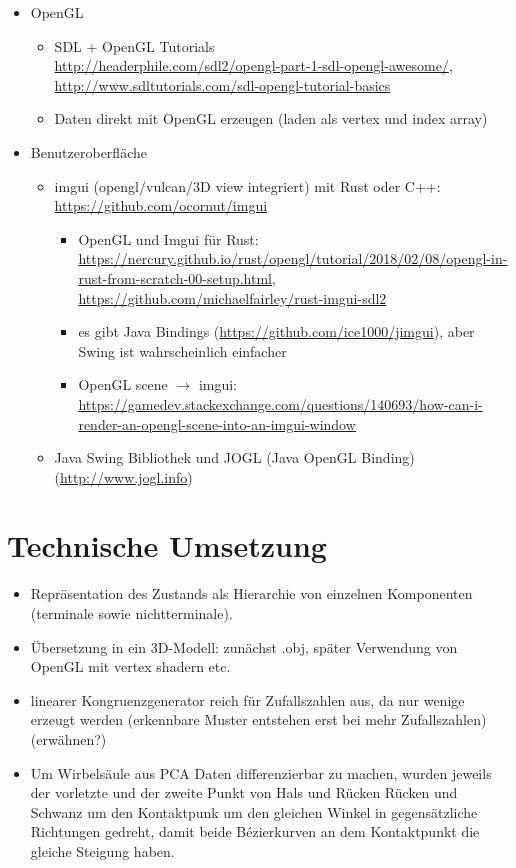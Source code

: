 \begin{itemize}
 \item OpenGL
 \begin {itemize}
  \item SDL + OpenGL Tutorials \\ \url{http://headerphile.com/sdl2/opengl-part-1-sdl-opengl-awesome/}, \\ \url{http://www.sdltutorials.com/sdl-opengl-tutorial-basics}
  \item Daten direkt mit OpenGL erzeugen (laden als vertex und index array)
 \end {itemize}

 \item Benutzeroberfläche
 \begin{itemize}
  \item imgui (opengl/vulcan/3D view integriert) mit Rust oder C++: \url{https://github.com/ocornut/imgui}
  
  \begin{itemize}
   \item OpenGL und Imgui für Rust: \url{https://nercury.github.io/rust/opengl/tutorial/2018/02/08/opengl-in-rust-from-scratch-00-setup.html}, \url{https://github.com/michaelfairley/rust-imgui-sdl2}
   \item es gibt Java Bindings (\url{https://github.com/ice1000/jimgui}), aber Swing ist wahrscheinlich einfacher
   \item OpenGL scene $\rightarrow$ imgui: \url{https://gamedev.stackexchange.com/questions/140693/how-can-i-render-an-opengl-scene-into-an-imgui-window}
  \end{itemize}

  
  \item Java Swing Bibliothek und JOGL (Java OpenGL Binding) (\url{http://www.jogl.info})
 \end{itemize}
\end{itemize}

\section{Technische Umsetzung}

\begin{itemize}
 \item Repräsentation des Zustands als Hierarchie von einzelnen Komponenten (terminale sowie nichtterminale).
 \item Übersetzung in ein 3D-Modell: zunächst .obj, später Verwendung von OpenGL mit vertex shadern etc.\
 \item linearer Kongruenzgenerator reich für Zufallszahlen aus, da nur wenige erzeugt werden (erkennbare Muster entstehen erst bei mehr Zufallszahlen) (erwähnen?)
 \item Um Wirbelsäule aus PCA Daten differenzierbar zu machen, wurden jeweils der vorletzte und der zweite Punkt von Hals und Rücken \bzw Rücken und Schwanz um den Kontaktpunk um den gleichen Winkel in gegensätzliche Richtungen gedreht, damit beide Bézierkurven an dem Kontaktpunkt die gleiche Steigung haben. 
\end{itemize}

